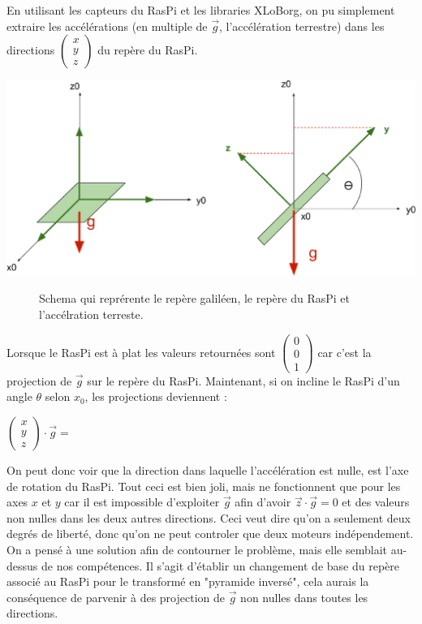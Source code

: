 \documentclass[twoside,twocolumn, 16pt]{article}
\newcommand{\icol}[1]{%
  \left(\begin{smallmatrix}#1\end{smallmatrix}\right)%
}
\begin{document}
En utilisant les capteurs du RasPi et les libraries XLoBorg, on pu simplement extraire les accélérations (en multiple de $\vec{g}$, l'accélération terrestre) dans les directions $\icol{x\\y\\z}$ du repère du RasPi. 
\begin{center}
\includegraphics [scale = 0.23] {acc.eps}
\begin{figure}[!h]
\caption{Schema qui reprérente le repère galiléen, le repère du RasPi et l'accélration terreste.}
\end{figure}
\end{center}
Lorsque le RasPi est à plat les valeurs retournées sont $\icol{0\\0\\1}$ car c'est la projection de $\vec{g}$ sur le repère du RasPi. Maintenant, si on incline le RasPi d'un angle $\theta$ selon $x_0$, les projections deviennent :
\begin{center}
$\icol{x\\y\\z} \cdot \vec{g} =$  \\
\end{center}
\indent On peut donc voir que la direction dans laquelle l'accélération est nulle, est l'axe de rotation du RasPi. Tout ceci est bien joli, mais ne fonctionnent que pour les axes $x$ et $y$ car il est impossible d'exploiter $\vec{g}$ afin d'avoir  $\vec{z} \cdot \vec{g} = 0$ et des valeurs non nulles dans les deux autres directions. Ceci veut dire qu'on a seulement deux degrés de liberté, donc qu'on ne peut controler que deux moteurs indépendement. \\
\indent On a pensé à une solution afin de contourner le problème, mais elle semblait au-dessus de nos compétences. Il s'agit d'établir un changement de base du repère associé au RasPi pour le transformé en "pyramide inversé", cela aurais la conséquence de parvenir à des projection de $\vec{g}$ non nulles dans toutes les directions. 
\end{document}
